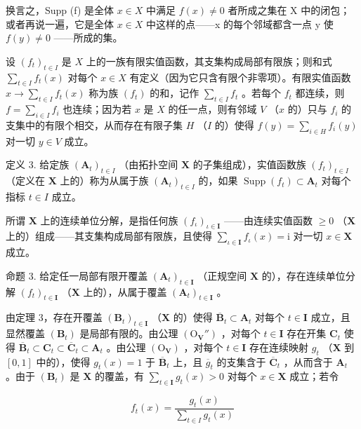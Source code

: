 换言之，Supp (f) 是全体 \(x \in X\) 中满足 \(f(x) \neq 0\) 者所成之集在 X 中的闭包；或者再说一遍，它是全体 \(x \in X\) 中这样的点——x 的每个邻域都含一点 y 使 \(f(y) \neq 0\) ——所成的集。

设 \((f_{t})_{t\in I}\) 是 \(X\) 上的一族有限实值函数，其支集构成局部有限族；则和式 \(\sum_{t\in I}f_t(x)\) 对每个 \(x\in X\) 有定义（因为它只含有限个非零项）。有限实值函数 \(x\to \sum_{t\in I}f_t(x)\) 称为族 \((f_{t})\) 的和，记作 \(\sum_{t\in I}f_{t}\) 。若每个 \(f_{t}\) 都连续，则 \(f = \sum_{i \in I} f_i\) 也连续；因为若 \(x\) 是 \(X\) 的任一点，则有邻域 \(V\) （\(x\) 的）只与 \(f_i\) 的支集中的有限个相交，从而存在有限子集 \(H\) （\(I\) 的）使得 \(f(y) = \sum_{i \in H} f_i(y)\) 对一切 \(y \in V\) 成立。

定义 3. 给定族 \((\mathbf{A}_{t})_{t\in I}\) （由拓扑空间 \(\mathbf{X}\) 的子集组成），实值函数族 \((f_t)_{t\in I}\) （定义在 \(\mathbf{X}\) 上的）称为从属于族 \((\mathbf{A}_t)_{t\in I}\) 的，如果 \(\operatorname{Supp}(f_t)\subset \mathbf{A}_t\) 对每个指标 \(t\in I\) 成立。

所谓 \(\mathbf{X}\) 上的连续单位分解，是指任何族 \((f_{\iota})_{\iota \in \mathbf{I}}\) ——由连续实值函数 \(\geqslant 0\) （\(\mathbf{X}\) 上的）组成——其支集构成局部有限族，且使得 \(\sum_{\iota \in \mathbf{I}} f_{\iota}(x) = \mathrm{i}\) 对一切 \(x \in \mathbf{X}\) 成立。

命题 3. 给定任一局部有限开覆盖 \((\mathbf{A}_t)_{t \in \mathbf{I}}\) （正规空间 \(\mathbf{X}\) 的），存在连续单位分解 \((f_t)_{t \in \mathbf{I}}\) （\(\mathbf{X}\) 上的），从属于覆盖 \((\mathbf{A}_t)_{t \in \mathbf{I}}\) 。

由定理 3，存在开覆盖 \((\mathbf{B}_t)_{t \in \mathbf{I}}\) （\(\mathbf{X}\) 的）使得 \(\overline{\mathbf{B}}_t \subset \mathbf{A}_t\) 对每个 \(t \in \mathbf{I}\) 成立，且显然覆盖 \((\mathbf{B}_t)\) 是局部有限的。由公理 \((\mathrm{O}_{\mathbf{V}}'')\) ，对每个 \(t \in \mathbf{I}\) 存在开集 \(\mathbf{C}_t\) 使得 \(\overline{\mathbf{B}}_t \subset \mathbf{C}_t \subset \overline{\mathbf{C}}_t \subset \mathbf{A}_t\) 。由公理 \((\mathrm{O}_{\mathbf{V}})\) ，对每个 \(t \in \mathbf{I}\) 存在连续映射 \(g_t\) （\(\mathbf{X}\) 到 \([0,1]\) 中的），使得 \(g_t(x) = 1\) 于 \(\overline{\mathbf{B}}_t\) 上，且 \(\overline{g}_t\) 的支集含于 \(\overline{\mathbf{C}}_t\) ，从而含于 \(\mathbf{A}_t\) 。由于 \((\mathbf{B}_t)\) 是 \(\mathbf{X}\) 的覆盖，有 \(\sum_{t \in \mathbf{I}} g_t(x) > 0\) 对每个 \(x \in \mathbf{X}\) 成立；若令

\[
f _ {t} (x) = \frac {g _ {t} (x)}{\sum_ {t \in I} g _ {t} (x)}
\]

